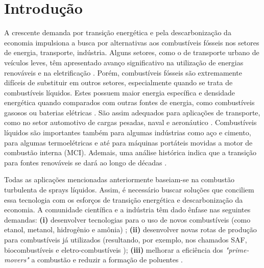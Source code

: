 \section{Introdução} \label{sec:intro}

A crescente demanda por transição energética e pela descarbonização da economia impulsiona a busca por alternativas aos combustíveis fósseis nos setores de energia, transporte, indústria. 
Alguns setores, como o de transporte urbano de veículos leves, têm apresentado avanço significativo na utilização de energias renováveis e na eletrificação \cite{MasriA2021}. 
Porém, combustíveis fósseis são extremamente difíceis de substituir em outros setores, especialmente quando se trata de combustíveis líquidos.
Estes possuem maior energia específica e densidade energética quando comparados com outras fontes de energia, como combustíveis gasosos ou baterias elétricas \cite{Bergthorson2017,Julien2017}.
São assim adequados para aplicações de transporte, como no setor automotivo de cargas pesadas, naval e aeronáutico \cite{MasriA2021}.
Combustíveis líquidos são importantes também para algumas indústrias como aço e cimento, para algumas termoelétricas e até para máquinas portáteis movidas a motor de combustão interna (MCI).
Ademais, uma análise histórica indica que a transição para fontes renováveis se dará ao longo de décadas \cite{MasriA2021}.

Todas as aplicações mencionadas anteriormente baseiam-se na combustão turbulenta de sprays líquidos.
Assim, é necessário buscar soluções que conciliem essa tecnologia com os esforços de transição energética e descarbonização da economia.
A comunidade científica e a indústria têm dado ênfase nas seguintes demandas: \textbf{(i)} desenvolver tecnologias para o uso de novos combustíveis (como  etanol, metanol, hidrogênio e amônia) \cite{MasriA2021,FAPESP_etanol_1,VerhelstS2019,TeohY2023,ElbazA2022}; \textbf{(ii)} desenvolver novas rotas de produção para combustíveis já utilizados (resultando, por exemplo, nos chamados SAF, biocombustíveis e eletro-combustíveis \cite{MasriA2021,BenJames-SAF,BergthorsonJ2015,WestbrookC2019,PalysM2022}); \textbf{(iii)} melhorar a eficiência dos \emph{"prime-movers"} a combustão e reduzir a formação de poluentes \cite{MasriA2021}.

